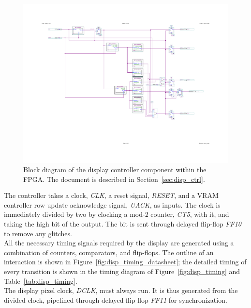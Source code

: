 \documentclass[titlepage]{scrartcl}
\begin{document}
	\begin{figure}[h!]
	\vspace{-4cm}
	\centerline{\includegraphics[width=30cm, angle=90, origin=c]{img/display_ctrl.pdf}}
		\vspace{-2cm}
                	\caption{Block diagram of the display controller component within the FPGA. The document is described in Section~\ref{sec:disp_ctrl}.}
               	\label{fig:disp_bdf}
	\end{figure}

	The controller takes a clock, \textit{CLK}, a reset signal, \textit{RESET}, and a VRAM controller row update acknowledge signal, \textit{UACK}, as inputs. The clock is immediately divided by two by clocking a mod-2 counter, \textit{CT5}, with it, and taking the high bit of the output. The bit is sent through delayed flip-flop \textit{FF10} to remove any glitches.\\

	All the necessary timing signals required by the display are generated using a combination of counters, comparators, and flip-flops. The outline of an interaction is shown in Figure~\ref{fig:disp_timing_datasheet}; the detailed timing of every transition is shown in the timing diagram of Figure~\ref{fig:disp_timing} and Table~\ref{tab:disp_timing}.\\

	The display pixel clock, \textit{DCLK}, must always run. It is thus generated from the divided clock, pipelined through delayed flip-flop \textit{FF11} for synchronization.\\
\end{document}
